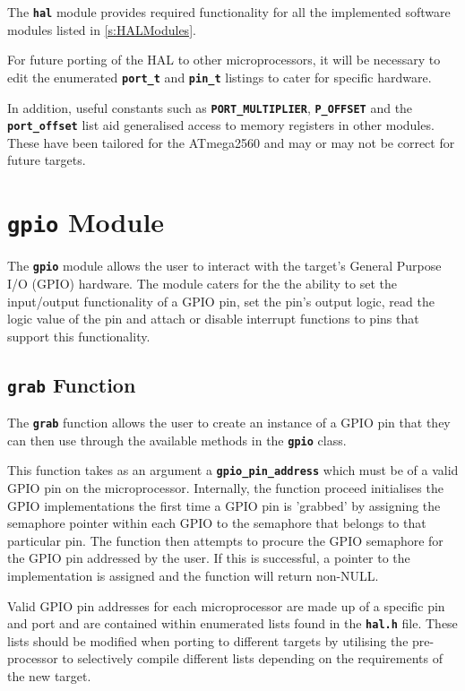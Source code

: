 \documentclass[a4paper, oneside, 11pt, titlepage, onecolumn, openright]{report}
\begin{document}
			The \textbf{\texttt{hal}} module provides required functionality for all the implemented software modules listed in \ref{s:HALModules}.
			
			For future porting of the HAL to other microprocessors, it will be necessary to edit the enumerated \textbf{\texttt{port\_t}} and \textbf{\texttt{pin\_t}} listings to cater for specific hardware.
			
			In addition, useful constants such as \textbf{\texttt{PORT\_MULTIPLIER}}, \textbf{\texttt{P\_OFFSET}} and the \textbf{\texttt{port\_offset}} list aid generalised access to memory registers in other modules. These have been tailored for the ATmega2560 and may or may not be correct for future targets.

\section{\textbf{\texttt{gpio}} Module}
			\label{s:HALgpioModule}
			The \textbf{\texttt{gpio}} module allows the user to interact with the target's General Purpose I/O (GPIO) hardware. The module caters for the the ability to set the input/output functionality of a GPIO pin, set the pin's output logic, read the logic value of the pin and attach or disable interrupt functions to pins that support this functionality.

\subsection{\textbf{\texttt{grab}} Function}
			\label{ss:HALgrabFunction}
			The \textbf{\texttt{grab}} function allows the user to create an instance of a GPIO pin that they can then use through the available methods in the \textbf{\texttt{gpio}} class. 
			
			This function takes as an argument a \textbf{\texttt{gpio\_pin\_address}} which must be of a valid GPIO pin on the microprocessor. Internally, the function proceed initialises the GPIO implementations the first time a GPIO pin is 'grabbed' by assigning the semaphore pointer within each GPIO to the semaphore that belongs to that particular pin. The function then attempts to procure the GPIO semaphore for the GPIO pin addressed by the user. If this is successful, a pointer to the implementation is assigned and the function will return non-NULL.
			
			Valid GPIO pin addresses for each microprocessor are made up of a specific pin and port and are contained within enumerated lists found in the \textbf{\texttt{hal.h}} file. These lists should be modified when porting to different targets by utilising the pre-processor to selectively compile different lists depending on the requirements of the new target.  			
\end{document}
